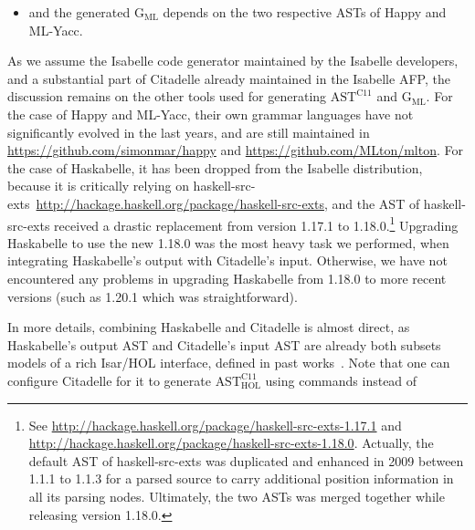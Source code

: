 \begin{isabellebody}
\begin{isamarkuptext}
\begin{itemize}
\item and the generated $\text{G}_{\text{ML}}$ depends on the two respective ASTs of Happy and
ML-Yacc.%
\end{itemize}%
\end{isamarkuptext}\isamarkuptrue%
%
\begin{isamarkuptext}%
As we assume the Isabelle code generator maintained by the Isabelle developers, and a
substantial part of Citadelle already maintained in the Isabelle AFP, the discussion remains on the
other tools used for generating $\text{AST}^{\text{C11}}$ and $\text{G}_{\text{ML}}$. For the case
of Happy and ML-Yacc, their own grammar languages have not significantly evolved in the last years,
and are still maintained in \url{https://github.com/simonmar/happy} and
\url{https://github.com/MLton/mlton}. For the case of Haskabelle, it has been
dropped from the Isabelle distribution, because it is critically relying on
haskell-src-exts~\url{http://hackage.haskell.org/package/haskell-src-exts}, and the
AST of haskell-src-exts received a drastic replacement from version 1.17.1 to 1.18.0.\footnote{See \url{http://hackage.haskell.org/package/haskell-src-exts-1.17.1} and
  \url{http://hackage.haskell.org/package/haskell-src-exts-1.18.0}. Actually, the
  default AST of haskell-src-exts was duplicated and enhanced in 2009 between 1.1.1 to 1.1.3 for a
  parsed source to carry additional position information in all its parsing nodes. Ultimately, the
  two ASTs was merged together while releasing version 1.18.0.} Upgrading Haskabelle to use
the new 1.18.0 was the most heavy task we performed, when integrating Haskabelle's output with
Citadelle's input. Otherwise, we have not encountered any problems in upgrading Haskabelle from
1.18.0 to more recent versions (such as 1.20.1 which was straightforward).%
\end{isamarkuptext}\isamarkuptrue%
%
\isadelimdocument
%
\endisadelimdocument
%
\isatagdocument
%
\isamarkuptrue%
%
\endisatagdocument
{\isafolddocument}%
%
\isadelimdocument
%
\endisadelimdocument
%
\begin{isamarkuptext}%
In more details, combining Haskabelle and Citadelle is almost direct, as Haskabelle's
output AST and Citadelle's input AST are already both subsets models of a rich Isar/HOL interface,
defined in past works~\cite{DBLP:journals/afp/TuongW15}. Note that one can configure Citadelle
for it to generate $\text{AST}^\text{C11}_{\text{HOL}}$ using
 commands instead of

\end{isamarkuptext}
\end{isabellebody}

